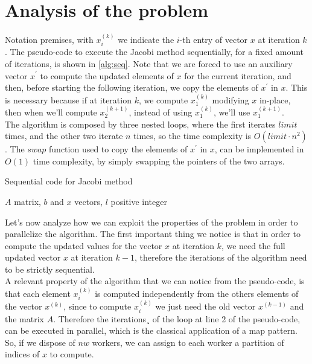 \documentclass[12pt]{article}
\begin{document}
	\section{Analysis of the problem}
	Notation premises, with $x_i^{(k)}$ we indicate the $i$-th entry of vector $x$ at iteration $k$. The pseudo-code to execute the Jacobi method sequentially, for a fixed amount of iterations, is shown in \ref{alg:seq}. Note that we are forced to use an auxiliary vector $x^\prime$ to compute the updated elements of $x$ for the current iteration, and then, before starting the following iteration, we copy the elements of $x^\prime$ in $x$. This is necessary because if at iteration $k$, we compute $x^{(k)}_1$ modifying $x$ in-place, then when we'll compute $x^{(k+1)}_2$, instead of using $x^{(k)}_1$, we'll use $x^{(k+1)}_1$.\\
	The algorithm is composed by three nested loops, where the first iterates $limit$ times, and the other two iterate $n$ times, so the time complexity is $O(limit\cdot n^2)$. The $swap$ function used to copy the elements of $x^\prime$ in $x$, can be implemented in $O(1)$ time complexity, by simply swapping the pointers of the two arrays.
	\begin{algorithm}[H]
		\caption{Sequential code for Jacobi method}\label{alg:seq}
		\begin{algorithmic}[1]
			\Require $A$ matrix, $b$ and $x$ vectors, $l$ positive integer
			\EndIf
			\EndFor
			\EndFor
			\EndFor
		\end{algorithmic}
	\end{algorithm}
	\noindent Let's now analyze how we can exploit the properties of the problem in order to parallelize the algorithm. The first important thing we notice is that in order to compute the updated values for the vector $x$ at iteration $k$, we need the full updated vector $x$ at iteration $k-1$, therefore the iterations of the algorithm need to be strictly sequential.\\
	A relevant property of the algorithm that we can notice from the pseudo-code, is that each element $x_i^{(k)}$ is computed independently from the others elements of the vector $x^{(k)}$, since to compute $x_i^{(k)}$ we just need the old vector $x^{(k-1)}$ and the matrix $A$. Therefore the iterations¸ of the loop at line 2 of the pseudo-code, can be executed in parallel, which is the classical application of a map pattern. So, if we dispose of $nw$ workers, we can assign to each worker a partition of indices of $x$ to compute.\\
\end{document}
